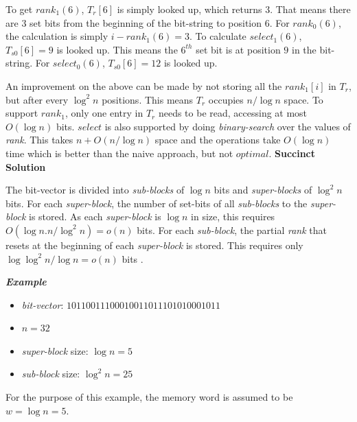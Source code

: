 \par
To get $rank_1(6)$, $T_r[6]$ is simply looked up, which returns $3$. That means there are $3$ set bits from the beginning of the bit-string to position $6$. For $rank_0(6)$, the calculation is simply $i - rank_1(6) = 3$. To calculate $select_1(6)$, $T_{s0}[6] = 9$ is looked up. This means the $6^{th}$ set bit is at position $9$ in the bit-string. For $select_0(6)$, $T_{s0}[6] = 12$ is looked up.
\par
An improvement on the above can be made by not storing all the $rank_1[i]$ in $T_r$, but after every $\log^2 n$ positions. This means $T_r$ occupies $n/\log n$ space. To support $rank_1$, only one entry in $T_r$ needs to be read, accessing at most $O(\log n)$ bits. $select$ is also supported by doing \textit{binary-search} over the values of \textit{rank}. This takes $n + O(n/\log n)$ space and the operations take $O(\log n)$ time which is better than the naive approach, but not $optimal$.
\newline\newline
\textbf{Succinct Solution}\par
The bit-vector is divided into \textit{sub-blocks} of $\log n$ bits and \textit{super-blocks} of $\log^2 n$ bits. For each \textit{super-block}, the number of set-bits of all \textit{sub-blocks} to the \textit{super-block} is stored. As each \textit{super-block} is $\log n$ in size, this requires $O(\log n . n/\log^2 n) = o(n)$ bits. For each \textit{sub-block}, the partial \textit{rank} that resets at the beginning of each \textit{super-block} is stored. This requires only $\log \log^2 n/\log n = o(n)$ bits \cite{Navarro_2012}. \par
\textit{\textbf{Example}}
\begin{itemize}
    \item \textit{bit-vector}: $10110011100010011011101010001011$
    \item $n = 32$
    \item \textit{super-block} size: $\log n = 5$
    \item \textit{sub-block} size: $\log^2 n = 25$
\end{itemize}
For the purpose of this example, the memory word is assumed to be $w = \log n = 5$. 

